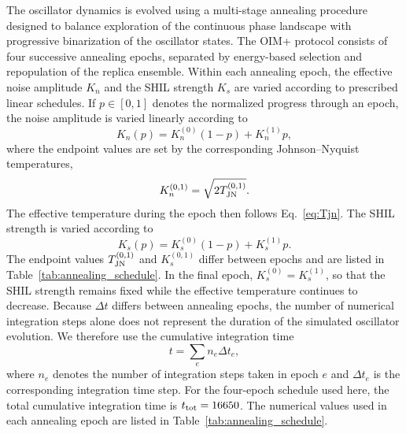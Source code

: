 \documentclass[
reprint,
amsmath,amssymb,
aps,
pre,
floatfix,
]{revtex4-2}
\begin{document}
The oscillator dynamics is evolved using a multi-stage annealing procedure designed to balance exploration of the continuous phase landscape with progressive binarization of the oscillator states. The OIM+ protocol consists of four successive annealing epochs, separated by energy-based selection and repopulation of the replica ensemble.
Within each annealing epoch, the effective noise amplitude
$K_{n}$ and the SHIL strength $K_s$ are varied according to
prescribed linear schedules. If $p\in[0,1]$ denotes the normalized progress through an epoch, the noise
amplitude is varied linearly according to
\begin{equation}
K_n(p)
=
K_n^{(0)}(1-p)
+
K_n^{(1)}p,
\end{equation}
where the endpoint values are set by the corresponding Johnson--Nyquist
temperatures,
\begin{equation}
K_n^{(0,1)}
=
\sqrt{2T_{\rm JN}^{(0,1)}}.
\end{equation}
The effective temperature during the epoch then follows Eq.~\eqref{eq:Tjn}.
The SHIL strength is varied according to
\begin{equation}
K_s(p)
=
K_s^{(0)}(1-p)
+
K_s^{(1)}p.
\end{equation}
The endpoint values $T_{\rm JN}^{(0,1)}$ and $K_s^{(0,1)}$ differ
between epochs and are listed in Table~\ref{tab:annealing_schedule}.
In the final epoch, $K_s^{(0)}=K_s^{(1)}$, so that the SHIL strength
remains fixed while the effective temperature continues to decrease.
Because $\Delta t$ differs between annealing epochs, the number of numerical
integration steps alone does not represent the duration of the simulated
oscillator evolution. We therefore use the cumulative integration time
\begin{equation}
t = \sum_e n_e \Delta t_e ,
\label{eq:cumulative_time}
\end{equation}
where $n_e$ denotes the number of integration steps taken in epoch $e$ and
$\Delta t_e$ is the corresponding integration time step. For the four-epoch
schedule used here, the total cumulative integration time is
$t_{\rm tot}=16650$. The numerical values used in each annealing epoch are listed in
Table~\ref{tab:annealing_schedule}.
\end{document}
